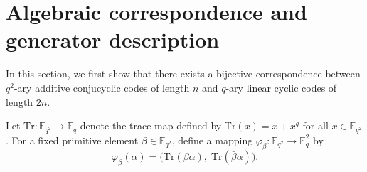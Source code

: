 \documentclass{aims}
\numberwithin{equation}{section}
\theoremstyle{definition}
\newcommand{\F}{\mathbb{F}}
\newcommand{\Tr}{\mathrm{Tr}}
\begin{document}
	
	

\section{Algebraic correspondence and generator description}\label{sec:structure}

In this section, we first show that there exists a bijective correspondence between $q^2$-ary additive conjucyclic codes of length $n$ and $q$-ary linear cyclic codes of length $2n$.

Let $\Tr: \F_{q^2} \to \F_q$ denote the trace map defined by $\Tr(x) = x + x^q$ for all $x \in \F_{q^2}$. For a fixed primitive element $\beta \in \F_{q^2}$, define a mapping $\varphi_\beta: \F_{q^2} \to \F_q^2$ by
\begin{equation}\label{eq333xx}
\varphi_\beta(\alpha) = \bigl( \Tr(\beta\alpha),\; \Tr(\bar{\beta}\alpha) \bigr).
\end{equation}
\end{document}
